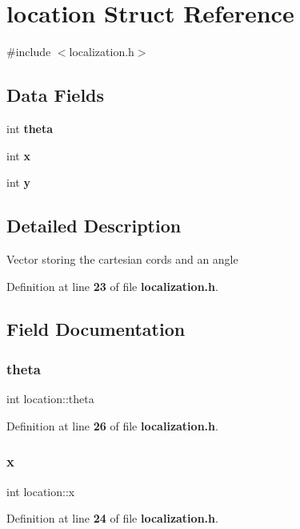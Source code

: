 \section{location Struct Reference}
\label{structlocation}


{\ttfamily \#include $<$localization.\+h$>$}

\subsection*{Data Fields}
\begin{DoxyCompactItemize}
\item 
int \textbf{ theta}
\item 
int \textbf{ x}
\item 
int \textbf{ y}
\end{DoxyCompactItemize}


\subsection{Detailed Description}
Vector storing the cartesian cords and an angle 

Definition at line \textbf{ 23} of file \textbf{ localization.\+h}.



\subsection{Field Documentation}
\mbox{\label{structlocation_a4b415222b4dcf34e49dacd22384be9eb}} 
\subsubsection{theta}
{\footnotesize\ttfamily int location\+::theta}



Definition at line \textbf{ 26} of file \textbf{ localization.\+h}.

\mbox{\label{structlocation_aacd18b2506c49d221cfc37b2119e3c3c}} 
\subsubsection{x}
{\footnotesize\ttfamily int location\+::x}



Definition at line \textbf{ 24} of file \textbf{ localization.\+h}.

